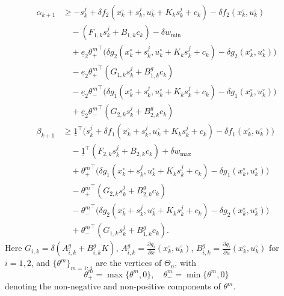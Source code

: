 \documentclass[final,5p,times,twocolumn,authoryear]{elsarticle}
\begin{document}
\begin{subequations}\label{eq:robust_tube_constraints}
\begin{align}
  \alpha_{k+1} &\geq -s_k^j + \delta f_2 (x_k^\circ+s_k^j , u_k^\circ + K_k s_k^j + c_k )  - \delta f_2 (x_k^\circ , u_k^\circ ) \nonumber \\
  &\quad - ( F_{1,k} s_k^j + B_{1,k} c_k )  - \delta w_{\min} \nonumber\\
  &\quad + \underline{e}_2 {\theta^m_+}^\top \bigl( \delta  g_2 (x_k^\circ+s_k^j , u_k^\circ + K_k s_k^j +  c_k ) - \delta g_2 (x_k^\circ , u_k^\circ )\bigr) \nonumber \\
  &\quad - \underline{e}_2 {\theta^m_+}^\top (G_{1,k} s_k^j + B^g_{1,k} c_k) \nonumber \\
  &\quad - \underline{e}_2 {\theta^m_-}^\top \bigl( \delta  g_1 (x_k^\circ+s_k^j , u_k^\circ + K_k s_k^j + c_k ) - \delta g_1 (x_k^\circ , u_k^\circ )\bigr) \nonumber \\
  &\quad + \underline{e}_2 {\theta^m_-}^\top (G_{2,k} s_k^j + B^g_{2,k} c_k)
\\
  \beta_{k+1} &\geq \underline{1}^\top \bigl( s_k^j + \delta f_1 (x_k^\circ + s_k^j , u_k^\circ + K_k s_k^j + c_k) - \delta f_1 (x_k^\circ,  u_k^\circ ) \bigr) \nonumber\\
  & \quad - \underline{1}^\top  (F_{2,k} s_k^j + B_{2,k} c_k) + \delta w_{\max} \nonumber\\
  &\quad  + {\theta^m_+}^\top \bigl( \delta  g_1 (x_k^\circ+s_k^j , u_k^\circ + K_k s_k^j + c_k ) - \delta g_1 (x_k^\circ , u_k^\circ )\bigr) \nonumber \\
  &\quad - {\theta^m_+}^\top (G_{2,k} s_k^j + B^g_{2,k} c_k) \nonumber  \\
  &\quad - {\theta^m_-}^\top \bigl( \delta  g_2 (x_k^\circ+s_k^j , u_k^\circ + K_k s_k^j +  c_k ) - \delta g_2 (x_k^\circ , u_k^\circ )\bigr) \nonumber \\
  &\quad + {\theta^m_-}^\top (G_{1,k} s_k^j + B^g_{1,k} c_k) .
\end{align}
\end{subequations}
Here $G_{i,k} = \delta( A^g_{i,k} + B^g_{i,k} K) $, $A^g_{i,k} = \tfrac{\partial g_i}{\partial x} (x_k^\circ , u_k^\circ)$, $B^g_{i,k}= \tfrac{\partial g_i}{\partial u} (x_k^\circ, u_k^\circ )$ for $i=1,2$, and $\{\theta^m\}_{m=1:4}$ are the vertices of $\Theta_n$, with
\[
\theta^m_+ = \max\{\theta^m, 0\}, \quad \theta^m_- = \min \{ \theta^m , 0\}
\]
denoting the non-negative and non-positive components of $\theta^m$.
\end{document}

